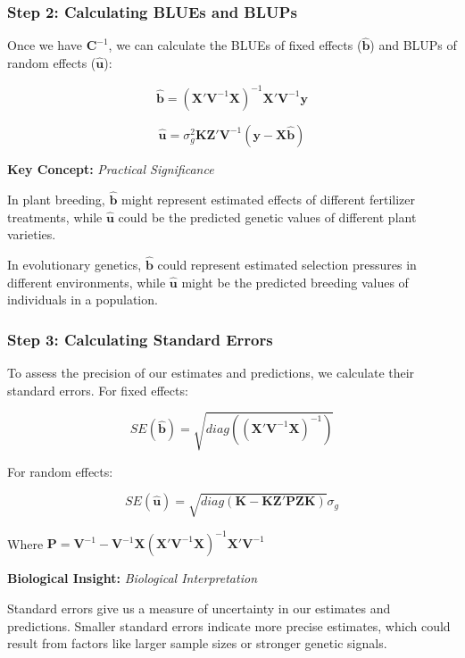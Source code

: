 \documentclass[12pt,a4paper]{article}
\newenvironment{keyconceptbox}[1][]
{\begin{basebox}[linecolor=uqblue]
\textbf{\color{uqblue}Key Concept:} \textit{#1}\par\noindent\ignorespaces}
{\end{basebox}}
\newenvironment{biologicalinsightbox}[1][]
{\begin{basebox}[linecolor=uqpurple]
\textbf{\color{uqpurple}Biological Insight:} \textit{#1}\par\noindent\ignorespaces}
{\end{basebox}}
\begin{document}
\subsubsection{Step 2: Calculating BLUEs and BLUPs}

Once we have $\mathbf{C}^{-1}$, we can calculate the BLUEs of fixed effects ($\hat{\mathbf{b}}$) and BLUPs of random effects ($\hat{\mathbf{u}}$):

\[
\hat{\mathbf{b}} = (\mathbf{X'V}^{-1}\mathbf{X})^{-1} \mathbf{X'V}^{-1}\mathbf{y}
\]

\[
\hat{\mathbf{u}} = \sigma^2_g\mathbf{KZ'V}^{-1}(\mathbf{y} - \mathbf{X}\hat{\mathbf{b}})
\]

\begin{keyconceptbox}[Practical Significance]

In plant breeding, $\hat{\mathbf{b}}$ might represent estimated effects of different fertilizer treatments, while $\hat{\mathbf{u}}$ could be the predicted genetic values of different plant varieties.

In evolutionary genetics, $\hat{\mathbf{b}}$ could represent estimated selection pressures in different environments, while $\hat{\mathbf{u}}$ might be the predicted breeding values of individuals in a population.
\end{keyconceptbox}

\subsubsection{Step 3: Calculating Standard Errors}

To assess the precision of our estimates and predictions, we calculate their standard errors. For fixed effects:

\[
SE(\hat{\mathbf{b}}) = \sqrt{diag((\mathbf{X'V}^{-1}\mathbf{X})^{-1})}
\]

For random effects:

\[
SE(\hat{\mathbf{u}}) = \sqrt{diag(\mathbf{K} - \mathbf{K}\mathbf{Z'P}\mathbf{Z}\mathbf{K})} \sigma_g
\]

Where $\mathbf{P} = \mathbf{V}^{-1} - \mathbf{V}^{-1}\mathbf{X}(\mathbf{X'V}^{-1}\mathbf{X})^{-1}\mathbf{X'V}^{-1}$

\begin{biologicalinsightbox}[Biological Interpretation]

Standard errors give us a measure of uncertainty in our estimates and predictions. Smaller standard errors indicate more precise estimates, which could result from factors like larger sample sizes or stronger genetic signals.
\end{biologicalinsightbox}
\end{document}
